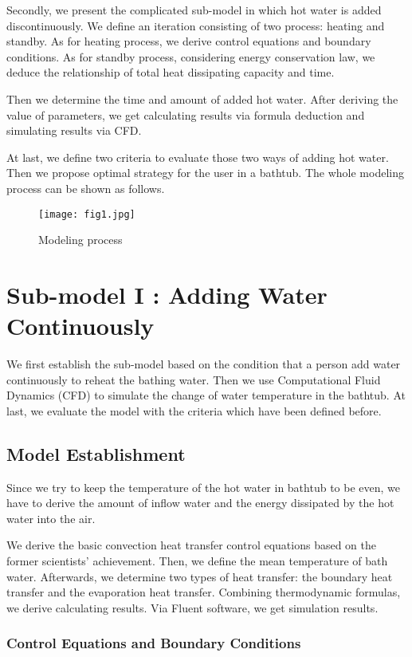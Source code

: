 \documentclass{mcmthesis}
\begin{document}
Secondly, we present the complicated sub-model in which hot water is
added discontinuously. We define an iteration consisting of two process:
heating and standby. As for heating process, we derive control equations and boundary conditions. As for standby process, considering energy conservation law, we deduce the relationship of total heat dissipating capacity and time.

Then we determine the time and amount of added hot water. After deriving the value of parameters, we get calculating results via formula deduction and simulating results via CFD.

At last, we define two criteria to evaluate those two ways of adding hot water. Then we propose optimal strategy for the user in a bathtub.
The whole modeling process can be shown as follows.

\begin{figure}[h] 
\centering
\texttt{[image: fig1.jpg]}
\caption{Modeling process} \label{fig1}
\end{figure}

\section{Sub-model I : Adding Water Continuously}

We first establish the sub-model based on the condition that a person add water continuously to reheat the bathing water. Then we use Computational Fluid Dynamics (CFD) to simulate the change of water temperature in the bathtub. At last, we evaluate the model with the criteria which have been defined before.

\subsection{Model Establishment}

Since we try to keep the temperature of the hot water in bathtub to be even, we have to derive the amount of inflow water and the energy dissipated by the hot water into the air.

We derive the basic convection heat transfer control equations based on the former scientists’ achievement. Then, we define the mean temperature of bath water. Afterwards, we determine two types of heat transfer: the boundary heat transfer and the evaporation heat transfer. Combining thermodynamic formulas, we derive calculating results. Via Fluent software, we get simulation results.

\subsubsection{Control Equations and Boundary Conditions}
\end{document}
